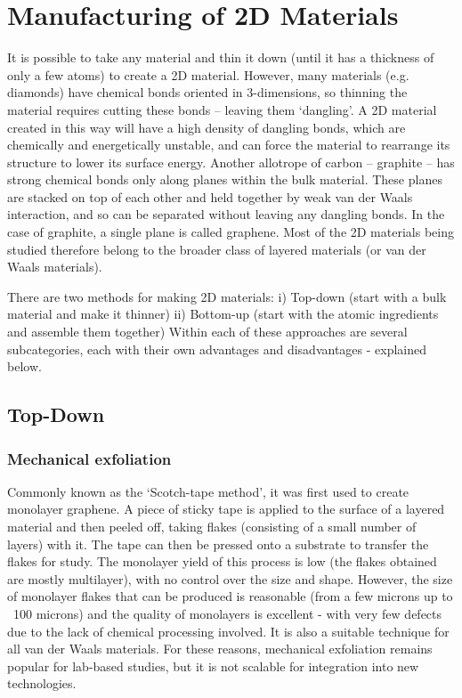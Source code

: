 \documentclass[12pt,a4paper]{report}
\begin{document}
\section{Manufacturing of 2D Materials}
It is possible to take any material and thin it down (until it has a thickness of only a few atoms) to create a 2D material. However, many materials (e.g. diamonds) have chemical bonds oriented in 3-dimensions, so thinning the material requires cutting these bonds – leaving them ‘dangling’. A 2D material created in this way will have a high density of dangling bonds, which are chemically and energetically unstable, and can force the material to rearrange its structure to lower its surface energy.
Another allotrope of carbon – graphite – has strong chemical bonds only along planes within the bulk material. These planes are stacked on top of each other and held together by weak van der Waals interaction, and so can be separated without leaving any dangling bonds. In the case of graphite, a single plane is called graphene. Most of the 2D materials being studied therefore belong to the broader class of layered materials (or van der Waals materials).

There are two methods for making 2D materials:
i) Top-down (start with a bulk material and make it thinner) 
ii) Bottom-up (start with the atomic ingredients and assemble them together)
Within each of these approaches are several subcategories, each with their own advantages and disadvantages - explained below.

\subsection{Top-Down}

\subsubsection{Mechanical exfoliation}
Commonly known as the ‘Scotch-tape method’, it was first used to create monolayer graphene. A piece of sticky tape is applied to the surface of a layered material and then peeled off, taking flakes (consisting of a small number of layers) with it. The tape can then be pressed onto a substrate to transfer the flakes for study. The monolayer yield of this process is low (the flakes obtained are mostly multilayer), with no control over the size and shape. However, the size of monolayer flakes that can be produced is reasonable (from a few microns up to ~100 microns) and the quality of monolayers is excellent - with very few defects due to the lack of chemical processing involved.
It is also a suitable technique for all van der Waals materials. For these reasons, mechanical exfoliation remains popular for lab-based studies, but it is not scalable for integration into new technologies.
\end{document}
